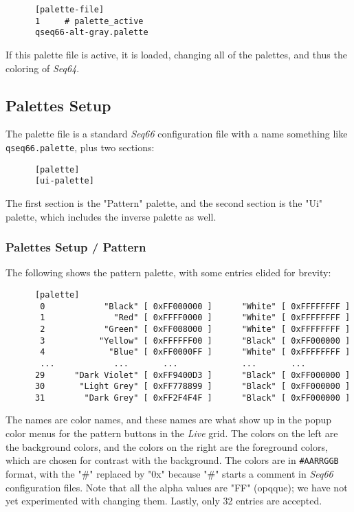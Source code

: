    \begin{verbatim}
      [palette-file]
      1     # palette_active
      qseq66-alt-gray.palette
   \end{verbatim}

   If this palette file is active, it is loaded, changing all of the palettes,
   and thus the coloring of \textsl{Seq64}.

\subsection{Palettes Setup}
\label{subsec:palettes_setup}

   The palette file is a standard \textsl{Seq66} configuration file with a name
   something like \texttt{qseq66.palette}, plus two sections:

   \begin{verbatim}
      [palette]
      [ui-palette]
   \end{verbatim}

   The first section is the "Pattern" palette, and the second section is the
   "Ui" palette, which includes the inverse palette as well.

\subsubsection{Palettes Setup / Pattern}
\label{subsubsec:palettes_setup_pattern}

   The following shows the pattern palette, with some entries elided for
   brevity:

   \begin{verbatim}
      [palette]
       0            "Black" [ 0xFF000000 ]      "White" [ 0xFFFFFFFF ]
       1              "Red" [ 0xFFFF0000 ]      "White" [ 0xFFFFFFFF ]
       2            "Green" [ 0xFF008000 ]      "White" [ 0xFFFFFFFF ]
       3           "Yellow" [ 0xFFFFFF00 ]      "Black" [ 0xFF000000 ]
       4             "Blue" [ 0xFF0000FF ]      "White" [ 0xFFFFFFFF ]
       ...            ...       ...             ...       ...
      29      "Dark Violet" [ 0xFF9400D3 ]      "Black" [ 0xFF000000 ]
      30       "Light Grey" [ 0xFF778899 ]      "Black" [ 0xFF000000 ]
      31        "Dark Grey" [ 0xFF2F4F4F ]      "Black" [ 0xFF000000 ]
   \end{verbatim}

   The names are color names, and these names are what show up in the popup
   color menus for the pattern buttons in the \textsl{Live} grid.
   The colors on the left are the background colors, and the colors on the
   right are the foreground colors, which are chosen for contrast with the
   background.  The colors are in \texttt{\#AARRGGB} format, with the "\#"
   replaced by "0x" because "\#" starts a comment in \textsl{Seq66}
   configuration files.  Note that all the alpha values are "FF" (opqque); we
   have not yet experimented with changing them.
   Lastly, only 32 entries are accepted.

